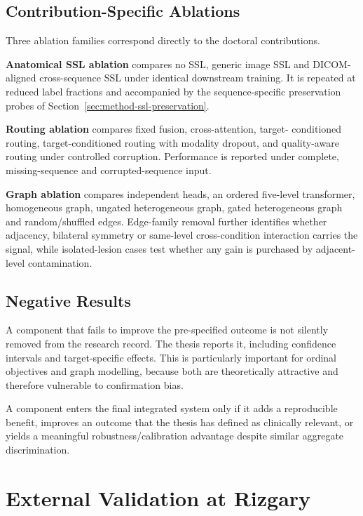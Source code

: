 \subsection{Contribution-Specific Ablations}
\label{sec:method-contribution-ablation}

Three ablation families correspond directly to the doctoral contributions.

\textbf{Anatomical SSL ablation} compares no SSL, generic image SSL and
DICOM-aligned cross-sequence SSL under identical downstream training. It is
repeated at reduced label fractions and accompanied by the sequence-specific
preservation probes of Section~\ref{sec:method-ssl-preservation}.

\textbf{Routing ablation} compares fixed fusion, cross-attention, target-
conditioned routing, target-conditioned routing with modality dropout, and
quality-aware routing under controlled corruption. Performance is reported
under complete, missing-sequence and corrupted-sequence input.

\textbf{Graph ablation} compares independent heads, an ordered five-level
transformer, homogeneous graph, ungated heterogeneous graph, gated
heterogeneous graph and random/shuffled edges. Edge-family removal further
identifies whether adjacency, bilateral symmetry or same-level cross-condition
interaction carries the signal, while isolated-lesion cases test whether any
gain is purchased by adjacent-level contamination.

\subsection{Negative Results}
\label{sec:method-negative-results}

A component that fails to improve the pre-specified outcome is not silently
removed from the research record. The thesis reports it, including confidence
intervals and target-specific effects. This is particularly important for
ordinal objectives and graph modelling, because both are theoretically
attractive and therefore vulnerable to confirmation bias.

A component enters the final integrated system only if it adds a reproducible
benefit, improves an outcome that the thesis has defined as clinically relevant,
or yields a meaningful robustness/calibration advantage despite similar
aggregate discrimination.

\section{External Validation at Rizgary}
\label{sec:method-external}

